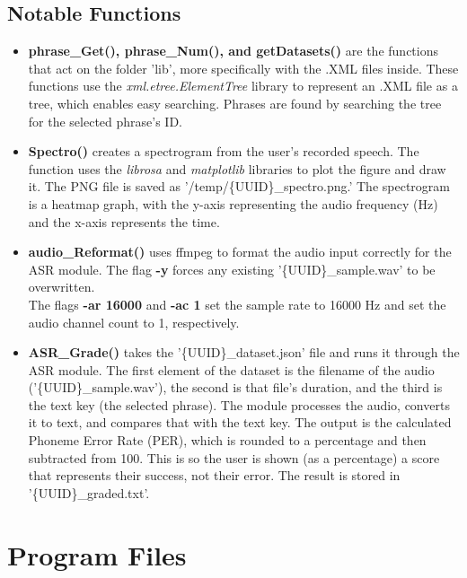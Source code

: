 \documentclass[12pt, letterpaper]{article}
\begin{document}
\subsection*{Notable Functions} \label{functions}
\begin{itemize}
\item{\textbf{phrase\_Get(), phrase\_Num(), and getDatasets()} are the functions that act on the folder 'lib', more specifically with the .XML files inside. These functions use the \textit{xml.etree.ElementTree} library to represent an .XML file as a tree, which enables easy searching. Phrases are found by searching the tree for the selected phrase's ID.}

\item{\textbf{Spectro()} creates a spectrogram from the user's recorded speech. The function uses the \textit{librosa} and \textit{matplotlib} libraries to plot the figure and draw it. The PNG file is saved as '/temp/\{UUID\}\_spectro.png.' The spectrogram is a heatmap graph, with the y-axis representing the audio frequency (Hz) and the x-axis represents the time.}

\item{\textbf{audio\_Reformat()} uses ffmpeg to format the audio input correctly for the ASR module. The flag \textbf{-y} forces any existing '\{UUID\}\_sample.wav' to be overwritten. \\The flags \textbf{-ar 16000} and \textbf{-ac 1} set the sample rate to 16000 Hz and set the audio channel count to 1, respectively.}

\item{\textbf{ASR\_Grade()} takes the '\{UUID\}\_dataset.json' file and runs it through the ASR module. The first element of the dataset is the filename of the audio ('\{UUID\}\_sample.wav'), the second is that file's duration, and the third is the text key (the selected phrase). The module processes the audio, converts it to text, and compares that with the text key. The output is the calculated Phoneme Error Rate (PER), which is rounded to a percentage and then subtracted from 100. This is so the user is shown (as a percentage) a score that represents their success, not their error.} The result is stored in '\{UUID\}\_graded.txt'.
\end{itemize}


\newpage%
\section*{Program Files} \label{files}
\end{document}
